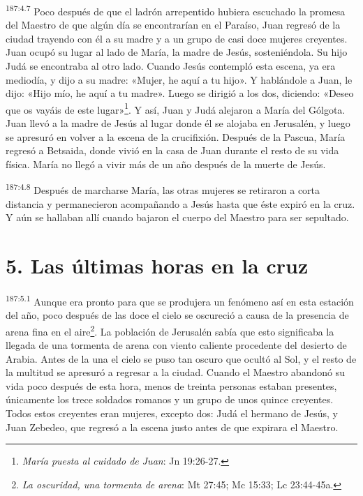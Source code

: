 \par 
\textsuperscript{187:4.7} Poco después de que el ladrón arrepentido hubiera escuchado la promesa del Maestro de que algún día se encontrarían en el Paraíso, Juan regresó de la ciudad trayendo con él a su madre y a un grupo de casi doce mujeres creyentes. Juan ocupó su lugar al lado de María, la madre de Jesús, sosteniéndola. Su hijo Judá se encontraba al otro lado. Cuando Jesús contempló esta escena, ya era mediodía, y dijo a su madre: «Mujer, he aquí a tu hijo». Y hablándole a Juan, le dijo: «Hijo mío, he aquí a tu madre». Luego se dirigió a los dos, diciendo: «Deseo que os vayáis de este lugar»\footnote{\textit{María puesta al cuidado de Juan}: Jn 19:26-27.}. Y así, Juan y Judá alejaron a María del Gólgota. Juan llevó a la madre de Jesús al lugar donde él se alojaba en Jerusalén, y luego se apresuró en volver a la escena de la crucifixión. Después de la Pascua, María regresó a Betsaida, donde vivió en la casa de Juan durante el resto de su vida física. María no llegó a vivir más de un año después de la muerte de Jesús.

\par 
\textsuperscript{187:4.8} Después de marcharse María, las otras mujeres se retiraron a corta distancia y permanecieron acompañando a Jesús hasta que éste expiró en la cruz. Y aún se hallaban allí cuando bajaron el cuerpo del Maestro para ser sepultado.

\section*{5. Las últimas horas en la cruz}
\par 
\textsuperscript{187:5.1} Aunque era pronto para que se produjera un fenómeno así en esta estación del año, poco después de las doce el cielo se oscureció a causa de la presencia de arena fina en el aire\footnote{\textit{La oscuridad, una tormenta de arena}: Mt 27:45; Mc 15:33; Lc 23:44-45a.}. La población de Jerusalén sabía que esto significaba la llegada de una tormenta de arena con viento caliente procedente del desierto de Arabia. Antes de la una el cielo se puso tan oscuro que ocultó al Sol, y el resto de la multitud se apresuró a regresar a la ciudad. Cuando el Maestro abandonó su vida poco después de esta hora, menos de treinta personas estaban presentes, únicamente los trece soldados romanos y un grupo de unos quince creyentes. Todos estos creyentes eran mujeres, excepto dos: Judá el hermano de Jesús, y Juan Zebedeo, que regresó a la escena justo antes de que expirara el Maestro.

